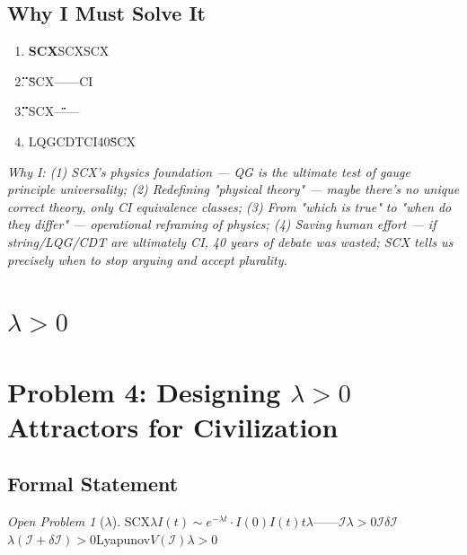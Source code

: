 \documentclass[12pt,a4paper]{article}
\theoremstyle{remark}
\newtheorem{openproblem}[theorem]{Open Problem}
\begin{document}
\subsection{ Why I Must Solve It}

\begin{enumerate}[label=(\arabic*)]
    \item \textbf{SCX}SCXSCX
    
    \item \textbf{\"\"}\"\"SCX——CI
    
    \item \textbf{\"\"\"\"}SCX\"\"\"\"——
    
    \item \textbf{}LQGCDTCI40\"\"SCX
\end{enumerate}

\medskip
\noindent\textit{Why I: (1) SCX's physics foundation — QG is the ultimate test of gauge principle universality; (2) Redefining "physical theory" — maybe there's no unique correct theory, only CI equivalence classes; (3) From "which is true" to "when do they differ" — operational reframing of physics; (4) Saving human effort — if string/LQG/CDT are ultimately CI, 40 years of debate was wasted; SCX tells us precisely when to stop arguing and accept plurality.}

\newpage


\section{$\lambda>0$}
\section*{Problem 4: Designing $\lambda > 0$ Attractors for Civilization}

\subsection{ Formal Statement}

\begin{openproblem}[$\lambda$]
\label{prob:lambda}
SCX$\lambda$$I(t) \sim e^{-\lambda t} \cdot I(0)$$I(t)$$t$$\lambda$——$\mathcal{I}$$\lambda > 0$$\mathcal{I}$\textbf{}$\delta\mathcal{I}$$\lambda(\mathcal{I} + \delta\mathcal{I}) > 0$Lyapunov$V(\mathcal{I})$$\lambda > 0$
\end{openproblem}
\end{document}
